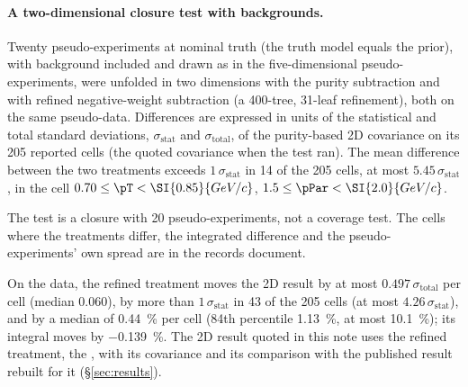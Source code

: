 \paragraph{A two-dimensional closure test with backgrounds.} Twenty pseudo-experiments at nominal truth (the truth model equals the prior), with background included and drawn as in the five-dimensional pseudo-experiments, were unfolded in two dimensions with the purity subtraction and with refined negative-weight subtraction (a 400-tree, 31-leaf refinement), both on the same pseudo-data. Differences are expressed in units of the statistical and total standard deviations, $\sigma_{\mathrm{stat}}$ and $\sigma_{\mathrm{total}}$, of the purity-based 2D covariance on its 205 reported cells (the quoted covariance when the test ran). The mean difference between the two treatments exceeds $1\,\sigma_{\mathrm{stat}}$ in 14 of the 205 cells, at most $5.45\,\sigma_{\mathrm{stat}}$, in the cell $0.70\le\pT<\SI{0.85}{GeV/c}$, $1.5\le\pPar<\SI{2.0}{GeV/c}$.

The test is a closure with 20 pseudo-experiments, not a coverage test. The cells where the treatments differ, the integrated difference and the pseudo-experiments' own spread are in the records document.

On the data, the refined treatment moves the 2D result by at most $0.497\,\sigma_{\mathrm{total}}$ per cell (median $0.060$), by more than $1\,\sigma_{\mathrm{stat}}$ in 43 of the 205 cells (at most $4.26\,\sigma_{\mathrm{stat}}$), and by a median of \SI{0.44}{\percent} per cell (84th percentile \SI{1.13}{\percent}, at most \SI{10.1}{\percent}); its integral moves by \SI{-0.139}{\percent}. The 2D result quoted in this note uses the refined treatment, the \estTwoD{}, with its covariance and its comparison with the published result rebuilt for it (\S\ref{sec:results}).


